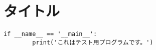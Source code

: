 \section{タイトル}
\begin{lstlisting}[caption=プログラムタイトル]
    if __name__ == '__main__':
        print('これはテスト用プログラムです。')
\end{lstlisting}
